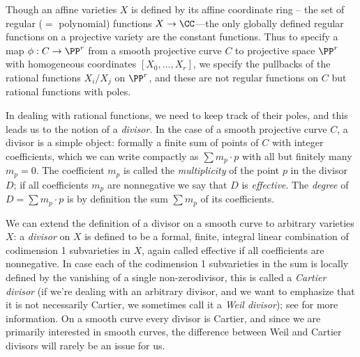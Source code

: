 Though an affine varieties $X$ is defined by its affine coordinate ring -- the set of regular ($=$ polynomial) functions $X\to \CC$---the only  globally defined regular functions on a projective variety are the constant functions. Thus to specify a map $\phi : C \to \PP^r$ from a smooth projective curve $C$ to projective space $\PP^r$ with homogeneous coordinates $[X_0,\dots,X_r]$, we specify the pullbacks of the rational functions $X_i/X_j$ on $\PP^r$, and these are not regular functions on $C$ but rational functions with poles.

In dealing with rational functions, we need to keep track of their poles, and this leads us to the notion of a \emph{divisor}. In the case of a smooth projective curve $C$, a divisor is a simple object: formally a finite sum of points of $C$ with integer coefficients, which we can write compactly as $\sum m_p\cdot p$ with all but finitely many $m_p=0$.  The coefficient $m_p$ is called the \emph{multiplicity} of the point $p$ in the divisor $D$; if all coefficients $m_p$ are nonnegative we say that $D$ is \emph{effective}. The \emph{degree} of  $D = \sum m_p\cdot p$ is by definition the sum $\sum m_p$ of its coefficients.

We can extend the definition of a divisor on a smooth curve to arbitrary varieties $X$: a \emph{divisor} on $X$ is defined to be a formal, finite, integral linear combination of codimension 1 subvarieties in $X$, again called effective if all coefficients are nonnegative. In case each of the codimension 1 subvarieties in the sum is locally defined by the vanishing of a single non-zerodivisor, this is called a \emph{Cartier divisor} (if we're dealing with an arbitrary divisor, and we want to emphasize that it is not necessarily Cartier, we sometimes call it a \emph{Weil divisor}); see \cite[pp. 140-146]{H} for more information.
On a smooth curve every divisor is Cartier, and since we are primarily interested in smooth curves, the difference between Weil and Cartier divisors will rarely be an issue for us.

